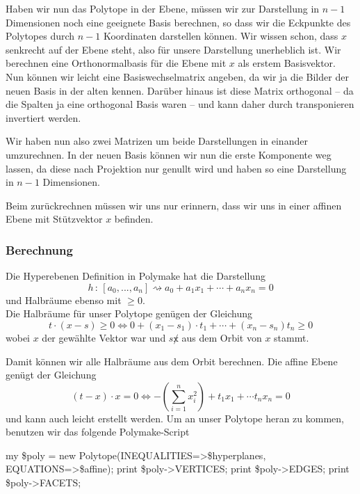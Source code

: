          Haben wir nun das Polytope in der Ebene, müssen wir zur Darstellung in $n-1$ Dimensionen noch eine geeignete Basis berechnen, so dass wir
         die Eckpunkte des Polytopes durch $n-1$ Koordinaten darstellen können. Wir wissen schon, dass $x$ senkrecht auf der Ebene steht, also für unsere Darstellung 
         unerheblich ist. Wir berechnen eine Orthonormalbasis für die Ebene mit $x$ als erstem Basisvektor. Nun können wir leicht eine Basiswechselmatrix angeben,
         da wir ja die Bilder der neuen Basis in der alten kennen. Darüber hinaus ist diese Matrix orthogonal -- da die Spalten ja eine orthogonal Basis waren -- und
         kann daher durch transponieren invertiert werden.

         Wir haben nun also zwei Matrizen um beide Darstellungen in einander umzurechnen. In der neuen Basis können wir nun die erste Komponente weg lassen,
         da diese nach Projektion nur genullt wird und haben so eine Darstellung in $n-1$ Dimensionen.

         Beim zurückrechnen müssen wir uns nur erinnern, dass wir uns in einer affinen Ebene mit Stützvektor $x$ befinden.

        \subsubsection*{Berechnung}

         Die Hyperebenen Definition in Polymake hat die Darstellung
         $$
            h \, : \, [a_0, ..., a_n] \rightsquigarrow a_0 + a_1 x_1 + \cdots + a_n x_n = 0
         $$
         und Halbräume ebenso mit $\geq 0$.\\

         Die Halbräume für unser Polytope genügen der Gleichung
         $$
            t \cdot (x - s) \geq 0 \Leftrightarrow 0 + (x_1-s_1)\cdot t_1 + \cdots + (x_n -s_n)t_n \geq 0
         $$
         wobei $x$ der gewählte Vektor war und $s \not x$ aus dem Orbit von $x$ stammt.

         Damit können wir alle Halbräume aus dem Orbit berechnen. Die affine Ebene genügt der Gleichung
         $$
            (t - x) \cdot x = 0 \Leftrightarrow - \left( \sum_{i=1}^n x_i^2 \right) + t_1 x_1 + \cdots t_n x_n = 0
         $$
         und kann auch leicht erstellt werden. Um an unser Polytope heran zu kommen, benutzen wir das folgende Polymake-Script

         \begin{code}
            my \$poly = new Polytope(INEQUALITIES=>\$hyperplanes, EQUATIONS=>\$affine);
            print \$poly->VERTICES;
            print \$poly->EDGES;
            print \$poly->FACETS;
         \end{code}

